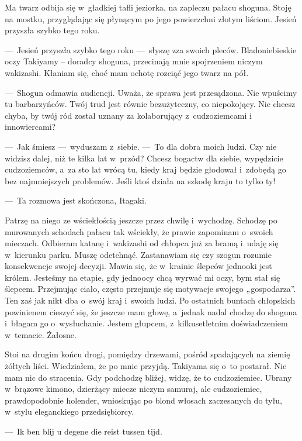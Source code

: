 \paraSep

Ma twarz odbija się w~gładkiej tafli jeziorka, na zapleczu pałacu shoguna. Stoję na mostku, przyglądając się płynącym 
po jego powierzchni złotym liściom. Jesień przyszła szybko tego roku.

---~Jesień przyszła szybko tego roku ---~słyszę zza swoich pleców. Bladoniebieskie oczy Takiyamy -- doradcy shoguna, 
przecinają mnie spojrzeniem niczym wakizashi. Kłaniam się, choć mam ochotę rozciąć jego twarz na pół.

---~Shogun odmawia audiencji. Uważa, że sprawa jest przesądzona. Nie wpuścimy tu barbarzyńców. Twój trud jest równie 
bezużyteczny, co niepokojący. Nie chcesz chyba, by twój ród został uznany za kolaborujący z~cudzoziemcami i~
innowiercami?

---~Jak śmiesz ---~wyduszam z~siebie. ---~To dla dobra moich ludzi. Czy nie widzisz dalej, niż te kilka lat w~przód? 
Chcesz bogactw dla siebie, wypędzicie cudzoziemców, a~za sto lat wrócą tu, kiedy kraj będzie głodował i~zdobędą go 
bez najmniejszych problemów. Jeśli ktoś działa na szkodę kraju to tylko ty!

---~Ta rozmowa jest skończona, Itagaki.

Patrzę na niego ze wściekłością jeszcze przez chwilę i~wychodzę. Schodzę po murowanych schodach pałacu tak wściekły, 
że prawie zapominam o~swoich mieczach. Odbieram katanę i~wakizashi od chłopca już za bramą i~udaję się w~kierunku 
parku. Muszę odetchnąć. Zastanawiam się czy szogun rozumie konsekwencje swojej decyzji. Mawia się, że w~krainie 
ślepców jednooki jest królem. Jesteśmy na etapie, gdy jednoocy chcą wyrwać mi oczy, bym stał się ślepcem. Przejmując 
ciało, często przejmuje się motywacje swojego „gospodarza”. Ten zaś jak nikt dba o~swój kraj i~swoich ludzi. Po 
ostatnich buntach chłopskich powinienem cieszyć się, że jeszcze mam głowę, a~jednak nadal chodzę do shoguna i~błagam 
go o~wysłuchanie. Jestem głupcem, z~kilkusetletnim doświadczeniem w~temacie. Żałosne.

Stoi na drugim końcu drogi, pomiędzy drzewami, pośród spadających na ziemię żółtych liści. Wiedziałem, że po mnie 
przyjdą. Takiyama się o~to postarał. Nie mam nic do stracenia. Gdy podchodzę bliżej, widzę, że to cudzoziemiec. 
Ubrany w~brązowe kimono, dzierżący miecze niczym samuraj, ale cudzoziemiec, prawdopodobnie holender, wnioskując po 
blond włosach zaczesanych do tyłu, w~stylu eleganckiego przedsiębiorcy.

---~Ik ben blij u degene die reist tussen tijd.

